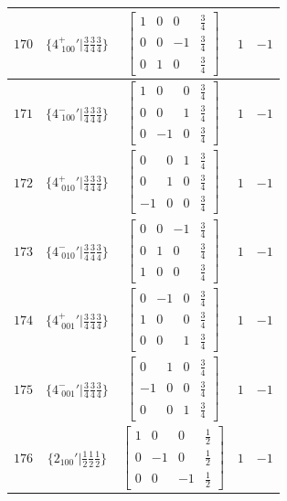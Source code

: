 \documentclass[fleqn,8pt]{jsarticle}
\begin{document}
\begin{longtable}{ccccc}
$ 170 $ & $ \{4^{+}_{\,\,100}{}'|\frac{3}{4} \frac{3}{4} \frac{3}{4}\} $ & $ \begin{bmatrix} 1 & 0 & 0 & \frac{3}{4} \\ 0 & 0 & -1 & \frac{3}{4} \\ 0 & 1 & 0 & \frac{3}{4} \end{bmatrix} $ & $ 1 $ & $ -1 $ \\ \hline
$ 171 $ & $ \{4^{-}_{\,\,100}{}'|\frac{3}{4} \frac{3}{4} \frac{3}{4}\} $ & $ \begin{bmatrix} 1 & 0 & 0 & \frac{3}{4} \\ 0 & 0 & 1 & \frac{3}{4} \\ 0 & -1 & 0 & \frac{3}{4} \end{bmatrix} $ & $ 1 $ & $ -1 $ \\ \hline
$ 172 $ & $ \{4^{+}_{\,\,010}{}'|\frac{3}{4} \frac{3}{4} \frac{3}{4}\} $ & $ \begin{bmatrix} 0 & 0 & 1 & \frac{3}{4} \\ 0 & 1 & 0 & \frac{3}{4} \\ -1 & 0 & 0 & \frac{3}{4} \end{bmatrix} $ & $ 1 $ & $ -1 $ \\ \hline
$ 173 $ & $ \{4^{-}_{\,\,010}{}'|\frac{3}{4} \frac{3}{4} \frac{3}{4}\} $ & $ \begin{bmatrix} 0 & 0 & -1 & \frac{3}{4} \\ 0 & 1 & 0 & \frac{3}{4} \\ 1 & 0 & 0 & \frac{3}{4} \end{bmatrix} $ & $ 1 $ & $ -1 $ \\ \hline
$ 174 $ & $ \{4^{+}_{\,\,001}{}'|\frac{3}{4} \frac{3}{4} \frac{3}{4}\} $ & $ \begin{bmatrix} 0 & -1 & 0 & \frac{3}{4} \\ 1 & 0 & 0 & \frac{3}{4} \\ 0 & 0 & 1 & \frac{3}{4} \end{bmatrix} $ & $ 1 $ & $ -1 $ \\ \hline
$ 175 $ & $ \{4^{-}_{\,\,001}{}'|\frac{3}{4} \frac{3}{4} \frac{3}{4}\} $ & $ \begin{bmatrix} 0 & 1 & 0 & \frac{3}{4} \\ -1 & 0 & 0 & \frac{3}{4} \\ 0 & 0 & 1 & \frac{3}{4} \end{bmatrix} $ & $ 1 $ & $ -1 $ \\ \hline
$ 176 $ & $ \{2{}_{100}{}'|\frac{1}{2} \frac{1}{2} \frac{1}{2}\} $ & $ \begin{bmatrix} 1 & 0 & 0 & \frac{1}{2} \\ 0 & -1 & 0 & \frac{1}{2} \\ 0 & 0 & -1 & \frac{1}{2} \end{bmatrix} $ & $ 1 $ & $ -1 $ \\ \hline

\end{longtable}
\end{document}
